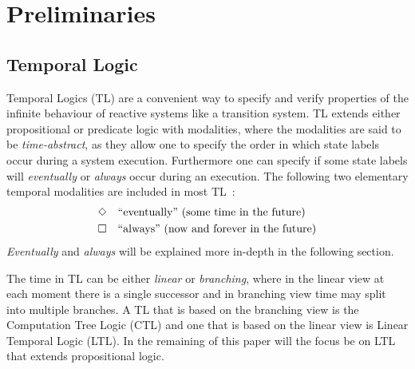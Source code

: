 \section{Preliminaries}\label{sec:preliminaries}

\subsection{Temporal Logic}
Temporal Logics (TL) are a convenient way to specify and verify properties of the infinite behaviour of reactive systems like a transition system. TL extends either propositional or predicate logic with modalities, where the modalities are said to be \emph{time-abstract}, as they allow one to specify the order in which state labels occur during a system execution. Furthermore one can specify if some state labels will \emph{eventually} or \emph{always} occur during an execution. The following two elementary temporal modalities are included in most TL~\cite{baier2008principles}:
\begin{align*}
    &\Diamond \quad \text{``eventually'' (some time in the future)}\\
    &\square \quad \text{``always'' (now and forever in the future)}
\end{align*}
\emph{Eventually} and \emph{always} will be explained more in-depth in the following section. 

The time in TL can be either \emph{linear} or \emph{branching}, where in the linear view at each moment there is a single successor and in branching view time may split into multiple branches. A TL that is based on the branching view is the Computation Tree Logic (CTL) and one that is based on the linear view is Linear Temporal Logic (LTL). In the remaining of this paper will the focus be on LTL that extends propositional logic.


